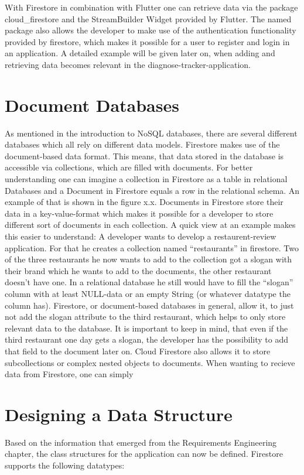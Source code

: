 With Firestore in combination with Flutter one can retrieve data via the package cloud\_firestore and the StreamBuilder Widget provided by Flutter. The named package also allows the developer to make use of the authentication functionality provided by firestore, which makes it possible for a user to register and login in an application. A detailed example will be given later on, when adding and retrieving data becomes relevant in the diagnose-tracker-application. 

\section{Document Databases}
As mentioned in the introduction to NoSQL databases, there are several different databases which all rely on different data models. Firestore makes use of the document-based data format. This means, that data stored in the database is accessible via collections, which are filled with documents. For better understanding one can imagine a collection in Firestore as a table in relational Databases and a Document in Firestore equals a row in the relational schema. An example of that is shown in the figure x.x. Documents in Firestore store their data in a key-value-format which makes it possible for a developer to store different sort of documents in each collection. A quick view at an example makes this easier to understand: A developer wants to develop a restaurent-review application. For that he creates a collection named “restaurants” in firestore. Two of the three restaurants he now wants to add to the collection got a slogan with their brand which he wants to add to the documents, the other restaurant doesn’t have one. In a relational database he still would have to fill the “slogan” column with at least NULL-data or an empty String (or whatever datatype the column has). Firestore, or document-based databases in general, allow it, to just not add the slogan attribute to the third restaurant, which helps to only store relevant data to the database. It is important to keep in mind, that even if the third restaurant one day gets a slogan, the developer has the possibility to add that field to the document later on. Cloud Firestore also allows it to store subcollections or complex nested objects to documents. When wanting to recieve data from Firestore, one can simply 

\section{Designing a Data Structure}
Based on the information that emerged from the Requirements Engineering chapter, the class structures for the application can now be defined. Firestore supports the following datatypes:


